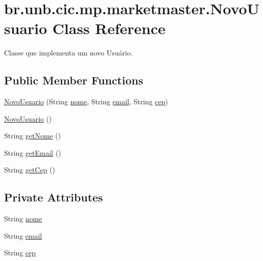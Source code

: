 \hypertarget{classbr_1_1unb_1_1cic_1_1mp_1_1marketmaster_1_1NovoUsuario}{}\section{br.\+unb.\+cic.\+mp.\+marketmaster.\+Novo\+Usuario Class Reference}
\label{classbr_1_1unb_1_1cic_1_1mp_1_1marketmaster_1_1NovoUsuario}


Classe que implementa um novo Usuário.  


\subsection*{Public Member Functions}
\begin{DoxyCompactItemize}
\item 
\mbox{\hyperlink{classbr_1_1unb_1_1cic_1_1mp_1_1marketmaster_1_1NovoUsuario_a95242c0af10864bb89340b3e3758c3a9}{Novo\+Usuario}} (String \mbox{\hyperlink{classbr_1_1unb_1_1cic_1_1mp_1_1marketmaster_1_1NovoUsuario_ad0af5db142fbb4882f81426b433fc5c9}{nome}}, String \mbox{\hyperlink{classbr_1_1unb_1_1cic_1_1mp_1_1marketmaster_1_1NovoUsuario_a1a4590b85df1630ad4a8618b734d381b}{email}}, String \mbox{\hyperlink{classbr_1_1unb_1_1cic_1_1mp_1_1marketmaster_1_1NovoUsuario_a1b5d766ae12f26cffba7f06e5fbd9f62}{cep}})
\item 
\mbox{\hyperlink{classbr_1_1unb_1_1cic_1_1mp_1_1marketmaster_1_1NovoUsuario_a66e0cdc16e389f189c40b98bcf020a42}{Novo\+Usuario}} ()
\item 
String \mbox{\hyperlink{classbr_1_1unb_1_1cic_1_1mp_1_1marketmaster_1_1NovoUsuario_a46edecde8b46640d8665049252b8c39a}{get\+Nome}} ()
\item 
String \mbox{\hyperlink{classbr_1_1unb_1_1cic_1_1mp_1_1marketmaster_1_1NovoUsuario_a92565cb339efa710b9539a00c9e1e787}{get\+Email}} ()
\item 
String \mbox{\hyperlink{classbr_1_1unb_1_1cic_1_1mp_1_1marketmaster_1_1NovoUsuario_a7b4c4df2ccaaaedd0fc4e1830bcb9757}{get\+Cep}} ()
\end{DoxyCompactItemize}
\subsection*{Private Attributes}
\begin{DoxyCompactItemize}
\item 
String \mbox{\hyperlink{classbr_1_1unb_1_1cic_1_1mp_1_1marketmaster_1_1NovoUsuario_ad0af5db142fbb4882f81426b433fc5c9}{nome}}
\item 
String \mbox{\hyperlink{classbr_1_1unb_1_1cic_1_1mp_1_1marketmaster_1_1NovoUsuario_a1a4590b85df1630ad4a8618b734d381b}{email}}
\item 
String \mbox{\hyperlink{classbr_1_1unb_1_1cic_1_1mp_1_1marketmaster_1_1NovoUsuario_a1b5d766ae12f26cffba7f06e5fbd9f62}{cep}}
\end{DoxyCompactItemize}


